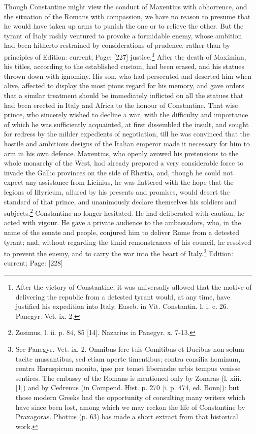 Though Constantine might view the conduct of Maxentius with abhorrence, and the situation of the Romans with compassion, we have no reason to presume that he would have taken up arms to punish the one or to relieve the other. But the tyrant of Italy rashly ventured to provoke a formidable enemy, whose ambition had been hitherto restrained by considerations of prudence, rather than by principles of Edition: current; Page: [227] justice.\footnote{After the victory of Constantine, it was universally allowed that the motive of delivering the republic from a detested tyrant would, at any time, have justified his expedition into Italy. Euseb. in Vit. Constantin. l. i. c. 26. Panegyr. Vet. ix. 2.} After the death of Maximian, his titles, according to the established custom, had been erased, and his statues thrown down with ignominy. His son, who had persecuted and deserted him when alive, affected to display the most pious regard for his memory, and gave orders that a similar treatment should be immediately inflicted on all the statues that had been erected in Italy and Africa to the honour of Constantine. That wise prince, who sincerely wished to decline a war, with the difficulty and importance of which he was sufficiently acquainted, at first dissembled the insult, and sought for redress by the milder expedients of negotiation, till he was convinced that the hostile and ambitious designs of the Italian emperor made it necessary for him to arm in his own defence. Maxentius, who openly avowed his pretensions to the whole monarchy of the West, had already prepared a very considerable force to invade the Gallic provinces on the side of Rhætia, and, though he could not expect any assistance from Licinius, he was flattered with the hope that the legions of Illyricum, allured by his presents and promises, would desert the standard of that prince, and unanimously declare themselves his soldiers and subjects.\footnote{Zosimus, l. ii. p. 84, 85 [14]. Nazarius in Panegyr. x. 7-13.} Constantine no longer hesitated. He had deliberated with caution, he acted with vigour. He gave a private audience to the ambassadors, who, in the name of the senate and people, conjured him to deliver Rome from a detested tyrant; and, without regarding the timid remonstrances of his council, he resolved to prevent the enemy, and to carry the war into the heart of Italy.\footnote{See Panegyr. Vet. ix. 2. Omnibus fere tuis Comitibus et Ducibus non solum tacite mussantibus, sed etiam aperte timentibus; contra consilia hominum, contra Haruspicum monita, ipse per temet liberandæ urbis tempus venisse sentires. The embassy of the Romans is mentioned only by Zonaras (l. xiii. [1]) and by Cedrenus (in Compend. Hist. p. 270 [i. p. 474, ed. Bonn]): but those modern Greeks had the opportunity of consulting many writers which have since been lost, among which we may reckon the life of Constantine by Praxagoras. Photius (p. 63) has made a short extract from that historical work.}
Edition: current; Page: [228]

